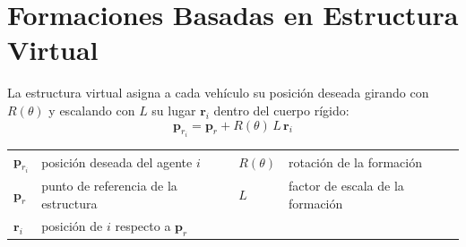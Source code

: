 \section{Formaciones Basadas en Estructura Virtual}

La estructura virtual asigna a cada vehículo su posición deseada girando con $R(\theta)$ y escalando con $L$ su lugar $\mathbf{r}_i$ dentro del cuerpo rígido:
\begin{equation*}
    \mathbf{p}_{r_i} = \mathbf{p}_r + R(\theta)\,L\,\mathbf{r}_i
\end{equation*}

{\footnotesize
\noindent
\begin{tabular}{l@{\ }l@{\qquad}l@{\ }l}
$\mathbf{p}_{r_i}$ & posición deseada del agente $i$ & $R(\theta)$ & rotación de la formación \\
$\mathbf{p}_r$ & punto de referencia de la estructura & $L$ & factor de escala de la formación \\
$\mathbf{r}_i$ & posición de $i$ respecto a $\mathbf{p}_r$ & & \\
\end{tabular}
}
